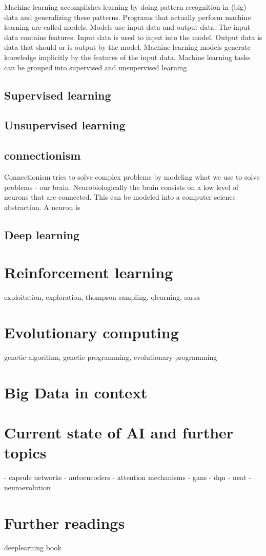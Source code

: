 \documentclass[jou,apacite]{apa6}
\begin{document}
Machine learning accomplishes learning by doing pattern recognition in (big) data and generalizing these patterns. 
Programs that actually perform machine learning are called models. Models use input data and output data. The input data contains features. Input data is used to input into the model. Output data is data that should or is output by the model. Machine learning models generate knowledge implicitly by the features of the input data. Machine learning tasks can be grouped into supervised and unsupervised learning.

\subsection{Supervised learning}

\subsection{Unsupervised learning}

\subsection{\gls{connectionism}}
Connectionism tries to solve complex problems by modeling what we use to solve problems - our brain. Neurobiologically the brain consists on a low level of neurons that are connected. This can be modeled into a computer science abstraction. A neuron is 

\subsection{Deep learning}

\section{Reinforcement learning}
exploitation, exploration, thompson sampling, qlearning, sarsa

\section{Evolutionary computing}
genetic algorithm, genetic programming, evolutionary programming

\section{Big Data in context}

\section{Current state of AI and further topics}
 - capsule networks
 - autoencoders
 - attention mechanisms
 - gans
 - dqn
 - neat
 - neuroevolution

\section{Further readings}
deeplearning book

\printglossaries
\printindex

\end{document}
